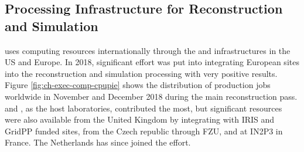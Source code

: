 \subsection{Processing Infrastructure for Reconstruction and Simulation}
\label{ch-comp-processing}
 uses computing resources internationally through the  and  infrastructures in the US and Europe.  In 2018, significant effort was put into integrating European sites into the  reconstruction and simulation processing with very positive results.  
Figure \ref{fig:ch-exec-comp-cpupie} shows the distribution of production jobs worldwide in November and December 2018 during the main reconstruction pass.   and , as the host laboratories, contributed the most, but significant resources were also available from the United Kingdom by integrating with IRIS and GridPP funded sites, from the Czech republic through FZU, and at IN2P3 in France. The Netherlands has since joined the effort.  


